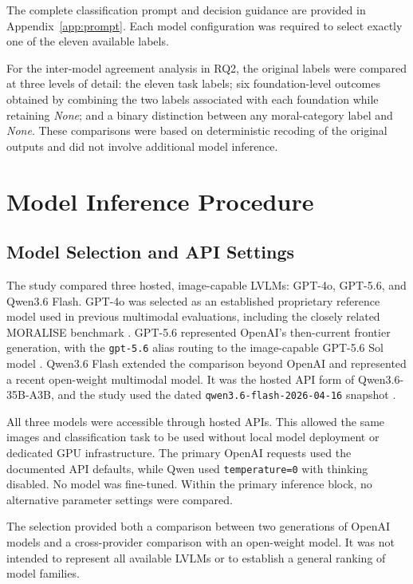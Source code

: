 The complete classification prompt and decision guidance are provided in
Appendix~\ref{app:prompt}. Each model configuration was required to select
exactly one of the eleven available labels.

For the inter-model agreement analysis in RQ2, the original labels were
compared at three levels of detail: the eleven task labels; six
foundation-level outcomes obtained by combining the two labels associated
with each foundation while retaining \textit{None}; and a binary distinction
between any moral-category label and \textit{None}. These comparisons were
based on deterministic recoding of the original outputs and did not involve
additional model inference.

\section{Model Inference Procedure}
\subsection{Model Selection and API Settings}
\label{subsec:model_selection}

The study compared three hosted, image-capable LVLMs: GPT-4o, GPT-5.6,
and Qwen3.6 Flash. GPT-4o was selected as an established proprietary
reference model used in previous multimodal evaluations, including the
closely related MORALISE benchmark
\cite{openai2026gpt4o,yue2025mmmupro,lin2026moralise}.  GPT-5.6 represented OpenAI's
then-current frontier generation, with the \texttt{gpt-5.6} alias routing
to the image-capable GPT-5.6 Sol model \cite{openai2026gpt56}. Qwen3.6
Flash extended the comparison beyond OpenAI and represented a recent
open-weight multimodal model. It was the hosted API form of
Qwen3.6-35B-A3B, and the study used the dated
\texttt{qwen3.6-flash-2026-04-16} snapshot
\cite{qwenteam2026qwen36,alibabacloud2026qwen36pricing}.

All three models were accessible through hosted APIs. This allowed the same
images and classification task to be used without local model deployment or
dedicated GPU infrastructure. The primary OpenAI requests used the documented
API defaults, while Qwen used \texttt{temperature=0} with thinking disabled.
No model was fine-tuned. Within the primary inference block, no alternative
parameter settings were compared.

The selection provided both a comparison between two generations of OpenAI
models and a cross-provider comparison with an open-weight model. It was not
intended to represent all available LVLMs or to establish a general ranking
of model families.

